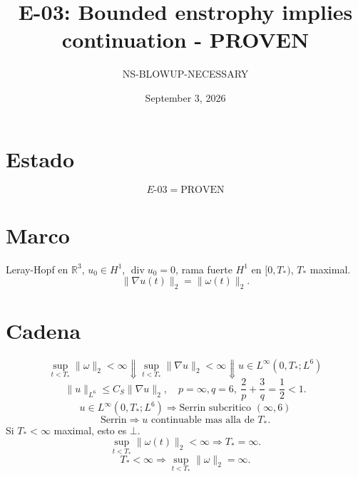 \documentclass[11pt]{article}
\title{E-03: Bounded enstrophy implies continuation - PROVEN}
\author{NS-BLOWUP-NECESSARY}
\date{September 3, 2026}
\begin{document}
\maketitle
\section*{Estado}
\[
\boxed{E\text{-}03=\mathrm{PROVEN}}
\]
\section*{Marco}
Leray-Hopf en $\mathbb R^3$, $u_0\in H^1$, $\operatorname{div}u_0=0$, rama fuerte $H^1$ en $[0,T_*)$, $T_*$ maximal.
\[
\|\nabla u(t)\|_2=\|\omega(t)\|_2.
\]
\section*{Cadena}
\[
\sup_{t<T_*}\|\omega\|_2<\infty
\Downarrow
\sup_{t<T_*}\|\nabla u\|_2<\infty
\Downarrow
u\in L^\infty(0,T_*;L^6)
\]
\[
\|u\|_{L^6}\le C_S\|\nabla u\|_2,\quad p=\infty,q=6,\ \frac2p+\frac3q=\frac12<1.
\]
\[
\boxed{
u\in L^\infty(0,T_*;L^6)\Longrightarrow\text{Serrin subcritico }(\infty,6)
}
\]
\[
\boxed{
\text{Serrin}\Longrightarrow u\text{ continuable mas alla de }T_*.
}
\]
Si $T_*<\infty$ maximal, esto es $\bot$.
\[
\boxed{
\sup_{t<T_*}\|\omega(t)\|_2<\infty\Longrightarrow T_*=\infty.
}
\]
\[
\boxed{
T_*<\infty\Longrightarrow\sup_{t<T_*}\|\omega\|_2=\infty.
}
\]
\end{document}
